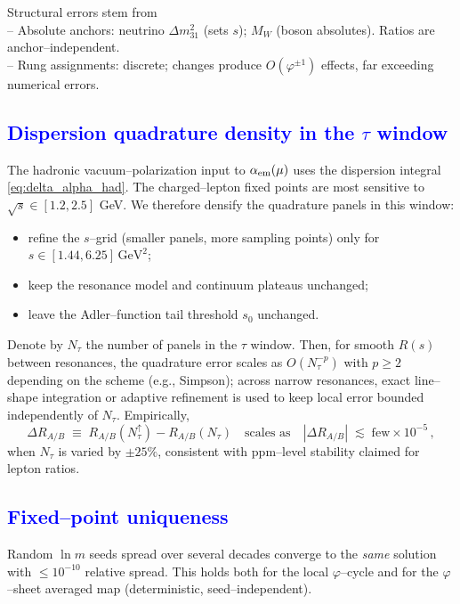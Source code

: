 \documentclass[%
 amsmath,amssymb,
 aps,
prb,
floatfix, showkeys
]{revtex4-2}
\newcommand{\modif}[1]{\textcolor{blue}{#1}}
\begin{document}
 Structural errors stem from \\ 
-- Absolute anchors: neutrino $\Delta m^2_{31}$ (sets $s$); $M_W$ (boson absolutes). Ratios are anchor--independent. \\
-- Rung assignments: discrete; changes produce $O(\varphi^{\pm 1})$ effects, far exceeding numerical errors.




{\modif{
\subsection{Dispersion quadrature density in the $\tau$ window}
\label{subsec:error_tau}
}}
The hadronic vacuum--polarization input to $\alpha_{\rm em}(\mu)$ uses the dispersion integral \eqref{eq:delta_alpha_had}. The charged--lepton fixed points are most sensitive to $\sqrt{s}\in[1.2,2.5]$ GeV.
We therefore densify the quadrature panels in this window:
\begin{itemize}
  \item refine the $s$--grid (smaller panels, more sampling points) only for $s\in[1.44,6.25]\,\mathrm{GeV}^2$;
  \item keep the resonance model and continuum plateaus unchanged;
  \item leave the Adler--function tail threshold $s_0$ unchanged.
\end{itemize}
Denote by $N_{\tau}$ the number of panels in the $\tau$ window. Then, for smooth $R(s)$ between resonances, the quadrature error scales as $O(N_{\tau}^{-p})$ with $p\ge 2$ depending on the scheme (e.g., Simpson); across narrow resonances, exact line–shape integration or adaptive refinement is used to keep local error bounded independently of $N_{\tau}$.
Empirically,
\[
  \Delta R_{A/B}\;\equiv\; R_{A/B}(N_{\tau}^\uparrow)-R_{A/B}(N_{\tau})
  \quad\text{scales as}\quad |\Delta R_{A/B}| \;\lesssim\; \mathrm{few}\times10^{-5}\,,
\]
when $N_{\tau}$ is varied by $\pm 25\%$, consistent with ppm--level stability claimed for lepton ratios.






{\modif{
\subsection{Fixed--point uniqueness}
\label{subsec:error_fixed_point}
}}
Random $\ln m$ seeds spread over several decades converge to the \emph{same} solution with $\le 10^{-10}$ relative spread. This holds both for the local $\varphi$–cycle and for the $\varphi$–sheet averaged map (deterministic, seed–independent).
\end{document}
